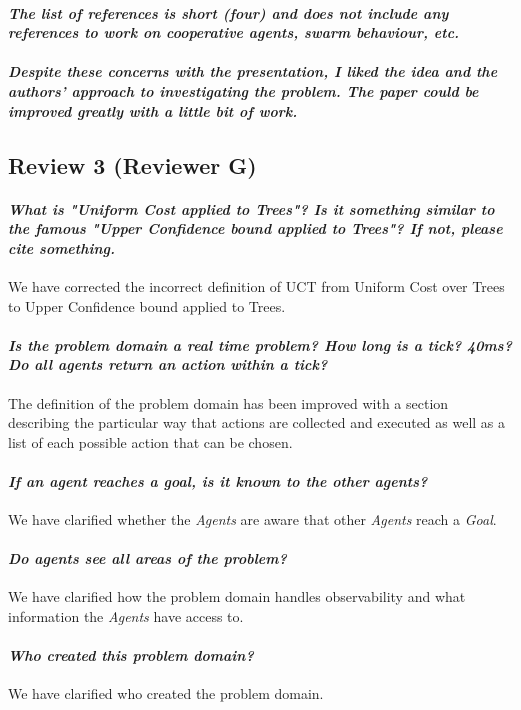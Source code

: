 \documentclass{article}
\begin{document}
\paragraph*{\textit{The list of references is short (four) and does not include any references to work on cooperative agents, swarm behaviour, etc.}}
\paragraph*{\textit{Despite these concerns with the presentation, I liked the idea and the authors' approach to investigating the problem. The paper could be improved greatly with a little bit of work.}}
\subsection{Review 3 (Reviewer G)}
\paragraph*{\textit{What is "Uniform Cost applied to Trees"? Is it something similar to the famous "Upper Confidence bound applied to Trees"? If not, please cite something.}}
We have corrected the incorrect definition of UCT from Uniform Cost over Trees to Upper Confidence bound applied to Trees.
\paragraph*{\textit{Is the problem domain a real time problem? How long is a tick? 40ms? Do all agents return an action within a tick?}}
The definition of the problem domain has been improved with a section describing the particular way that actions are collected and executed as well as a list of each possible action that can be chosen.
\paragraph*{\textit{If an agent reaches a goal, is it known to the other agents?}}
We have clarified whether the \emph{Agents} are aware that other \emph{Agents} reach a \emph{Goal}.
\paragraph*{\textit{Do agents see all areas of the problem?}}
We have clarified how the problem domain handles observability and what information the \emph{Agents} have access to.
\paragraph*{\textit{Who created this problem domain?}}
We have clarified who created the problem domain.
\end{document}
